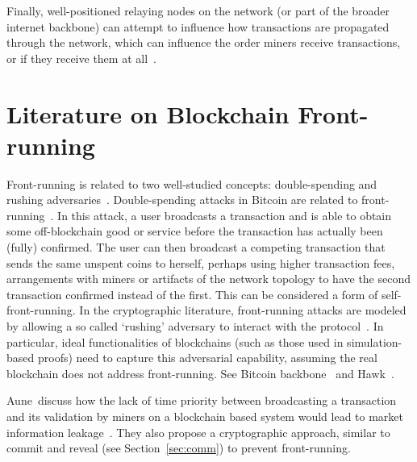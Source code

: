 Finally, well-positioned relaying nodes on the network (or part of the broader internet backbone) can attempt to influence how transactions are propagated through the network, which can influence the order miners receive transactions, or if they receive them at all~\cite{HKZG15,MGH18}.

\section{Literature on Blockchain Front-running}




Front-running is related to two well-studied concepts: double-spending and rushing adversaries~\cite{kosba2016hawk}. Double-spending attacks in Bitcoin are related to front-running~\cite{bamert2013have,karame2012double}. In this attack, a user broadcasts a transaction and is able to obtain some off-blockchain good or service before the transaction has actually been (fully) confirmed. The user can then broadcast a competing transaction that sends the same unspent coins to herself, perhaps using higher transaction fees, arrangements with miners or artifacts of the network topology to have the second transaction confirmed instead of the first. This can be considered a form of \textsf{self-front-running}.
In the cryptographic literature, front-running attacks are modeled by allowing a so called `rushing' adversary to interact with the protocol~\cite{beaver1992cryptographic}. In particular, ideal functionalities of blockchains (such as those used in simulation-based proofs) need to capture this adversarial capability, assuming the real blockchain does not address front-running. See \eg Bitcoin backbone~\cite{garay2015bitcoin} and Hawk~\cite{kosba2016hawk}.

Aune~\etal discuss how the lack of time priority between broadcasting a transaction and its validation by miners on a blockchain based system would lead to market information leakage~\cite{aune2017footprints}. They also propose a cryptographic approach, similar to commit and reveal (see Section~\ref{sec:comm}) to prevent front-running.

